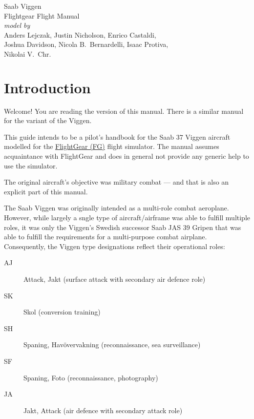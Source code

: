 \usepackage[english]{babel}
\usepackage[utf8]{inputenc}
\usepackage[T1]{fontenc}

\usepackage{graphicx}
\usepackage{hyperref}
\usepackage{wallpaper}
\usepackage{xcolor}
\usepackage{geometry}
\usepackage{pdflscape}

\pagestyle{headings}


\begin{titlepage}
  \centering
  \sf
  {\Huge Saab  Viggen}
  \\[1cm]
  {\Huge Flightgear Flight Manual}
  \\[16cm]
  \color{white}
  \emph{model by}\\
  Anders Lejczak, Justin Nicholson, Enrico Castaldi,\\
  Joshua Davidson, Nicola B.\ Bernardelli, Isaac Protiva,\\
  Nikolai V.\ Chr.
\end{titlepage}
\restoregeometry

\tableofcontents

\chapter{Introduction}

Welcome! You are reading the  version of this manual. There is a similar manual for the  variant of the Viggen.

This guide intends to be a pilot's handbook for the Saab 37 Viggen aircraft modelled for the \href{http://www.flightgear.org}{FlightGear (FG)} flight simulator. The manual assumes acquaintance with FlightGear and does in general not provide any generic help to use the simulator.

The original aircraft's objective was military combat --- and that is also an explicit part of this manual.

The Saab Viggen was originally intended as a multi-role combat aeroplane. However, while largely a sngle type of aircraft/airframe was able to fulfill multiple roles, it was only the Viggen's Swedish successor Saab JAS 39 Gripen that was able to fulfill the requirements for a multi-purpose combat airplane. Consequently, the Viggen type designations reflect their operational roles:
\begin{description}
\item[AJ] Attack, Jakt (surface attack with secondary air defence role)
\item[SK] Skol (conversion training)
\item[SH] Spaning, Havövervakning (reconnaissance, sea surveillance)
\item[SF] Spaning, Foto (reconnaissance, photography)
\item[JA] Jakt, Attack (air defence with secondary attack role)
\end{description}

